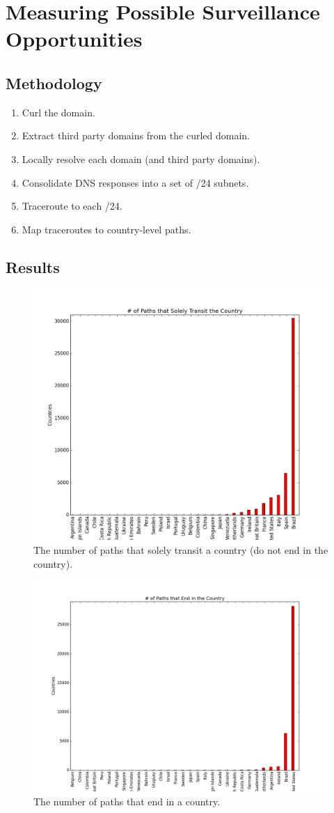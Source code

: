 \section{Measuring Possible Surveillance Opportunities}
\label{measure}

\subsection{Methodology}

\begin{enumerate}
\item Curl the domain.
\item Extract third party domains from the curled domain.
\item Locally resolve each domain (and third party domains).
\item Consolidate DNS responses into a set of /24 subnets.
\item Traceroute to each /24.
\item Map traceroutes to country-level paths.
\end{enumerate}

\subsection{Results}

\begin{figure}
\centering
\includegraphics[width=.5\textwidth]{transit_graph}
\caption{The number of paths that solely transit a country (do not end in the country).}
\label{fig:transit}
\end{figure}

\begin{figure}
\centering
\includegraphics[width=.5\textwidth]{host_graph}
\caption{The number of paths that end in a country.}
\label{fig:host}
\end{figure}

